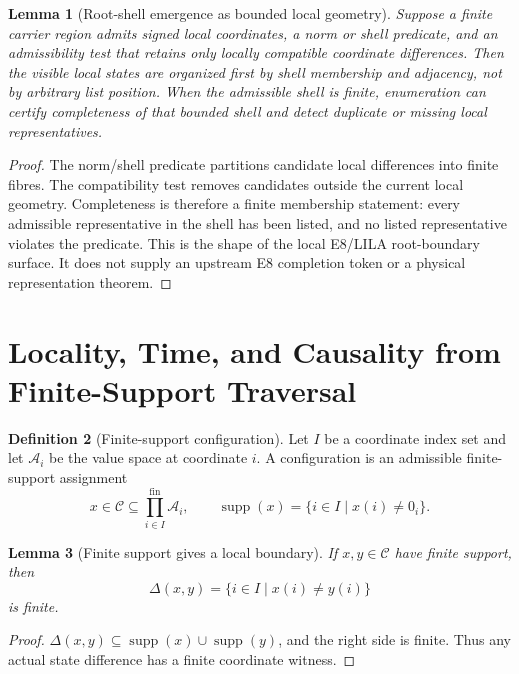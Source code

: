 \documentclass[11pt]{article}
\theoremstyle{definition}
\newtheorem{definition}{Definition}[section]
\theoremstyle{plain}
\newtheorem{lemma}[definition]{Lemma}
\theoremstyle{remark}
\begin{document}
\begin{lemma}[Root-shell emergence as bounded local geometry]
Suppose a finite carrier region admits signed local coordinates, a norm or
shell predicate, and an admissibility test that retains only locally compatible
coordinate differences. Then the visible local states are organized first by
shell membership and adjacency, not by arbitrary list position. When the
admissible shell is finite, enumeration can certify completeness of that
bounded shell and detect duplicate or missing local representatives.
\end{lemma}

\begin{proof}
The norm/shell predicate partitions candidate local differences into finite
fibres. The compatibility test removes candidates outside the current local
geometry. Completeness is therefore a finite membership statement: every
admissible representative in the shell has been listed, and no listed
representative violates the predicate. This is the shape of the local
E8/LILA root-boundary surface. It does not supply an upstream E8 completion
token or a physical representation theorem.
\end{proof}

\section{Locality, Time, and Causality from Finite-Support Traversal}

\begin{definition}[Finite-support configuration]
Let \(I\) be a coordinate index set and let \(\mathcal A_i\) be the value
space at coordinate \(i\). A configuration is an admissible finite-support
assignment
\[
x\in\mathcal C\subseteq\prod_{i\in I}^{\mathrm{fin}}\mathcal A_i,
\qquad
\operatorname{supp}(x)=\{i\in I\mid x(i)\neq 0_i\}.
\]
\end{definition}

\begin{lemma}[Finite support gives a local boundary]
If \(x,y\in\mathcal C\) have finite support, then
\[
\Delta(x,y)=\{i\in I\mid x(i)\neq y(i)\}
\]
is finite.
\end{lemma}

\begin{proof}
\(\Delta(x,y)\subseteq
\operatorname{supp}(x)\cup\operatorname{supp}(y)\), and the right side is
finite. Thus any actual state difference has a finite coordinate witness.
\end{proof}
\end{document}
